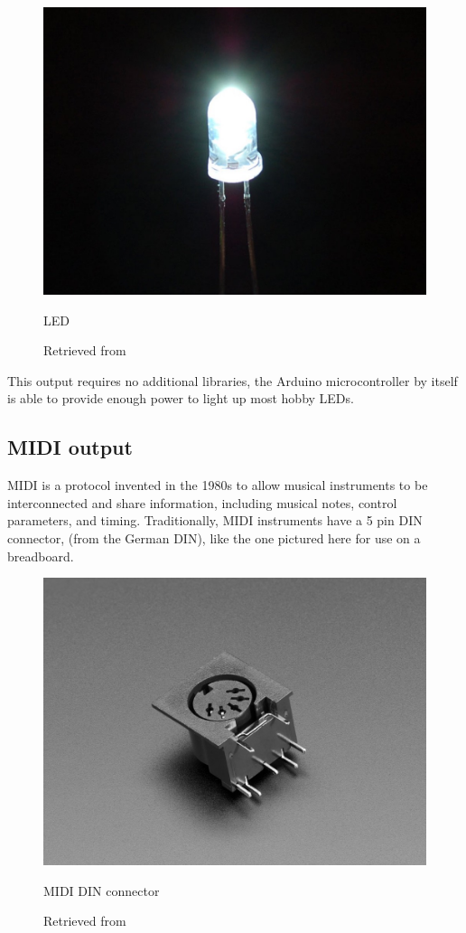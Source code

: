 \begin{figure}[ht]
  \centering
  \includegraphics[width=0.75\linewidth,height=0.25\textheight,keepaspectratio]{images/materials-adafruit-led.jpg}
  \caption{LED}
  \caption*{Retrieved from \cite{website-materials-adafruit-led}}
  \label{fig:materials-adafruit-led}
\end{figure}

This output requires no additional libraries, the Arduino microcontroller by itself is able to provide enough power to light up most hobby LEDs.

\subsection{MIDI output}

\acrfull{MIDI} is a protocol invented in the 1980s to allow musical instruments to be interconnected and share information, including musical notes, control parameters, and timing. Traditionally, MIDI instruments have a 5 pin  \acrshort{DIN} connector, (from the German \acrlong{DIN}), like the one pictured here for use on a breadboard.

\begin{figure}[ht]
  \centering
  \includegraphics[width=0.75\linewidth,height=0.25\textheight,keepaspectratio]{images/materials-adafruit-midi-jack.jpg}
  \caption{MIDI DIN connector}
  \caption*{Retrieved from \cite{website-materials-adafruit-midi-jack}}
  \label{fig:materials-adafruit-midi-jack}
\end{figure}

